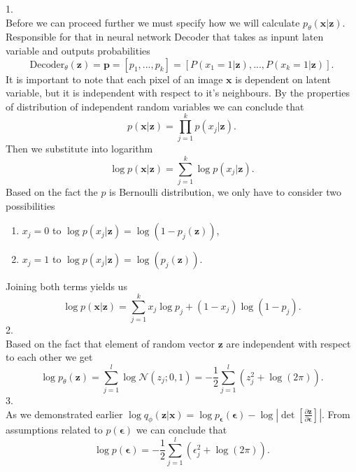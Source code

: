 \documentclass[10pt]{article}
\begin{document}
1. \\
Before we can proceed further we must specify how we will calculate $p_{\theta }(\textbf{x}|\textbf{z})$. Responsible for that in neural network Decoder that takes as inpunt laten variable and outputs probabilities
\begin{displaymath}
\text{Decoder}_{\theta}(\textbf{z}) = \textbf{p} = [p_1, ..., p_k] =[P(x_{1} = 1 | \textbf{z}), ..., P(x_{k} = 1 | \textbf{z})].
\end{displaymath}
It is important to note that each pixel of an image $\textbf{x}$ is dependent on latent variable, but it is independent with respect to it's neighbours. By the properties of distribution of independent random variables we can conclude that
\begin{equation}
    p(\textbf{x}|\textbf{z}) = \prod_{j=1}^{k}p(x_j|\textbf{z}).
\end{equation}
Then we substitute into logarithm
\begin{equation}
    \log p(\textbf{x}|\textbf{z}) = \sum_{j=1}^{k} \log p(x_j|\textbf{z}).
\end{equation}
Based on the fact the $p$ is Bernoulli distribution, we only have to consider two possibilities
\begin{enumerate}
    \item $x_j = 0$ to $\log p(x_j|\textbf{z}) = \log(1 - p_j(\textbf{z}))$,
    \item $x_j = 1$ to $\log p(x_j|\textbf{z}) = \log(p_j(\textbf{z}))$.
\end{enumerate}
Joining both terms yields us 
\begin{equation}
    \log p(\textbf{x}|\textbf{z}) = \sum_{j=1}^{k} x_j \log p_j + (1-x_j)\log(1 - p_j).
\end{equation}
2. \\ 
Based on the fact that element of random vector $\textbf{z}$ are independent with respect to each other we get
\begin{equation}
     \log p_{\theta }(\textbf{z}) = \sum_{j=1}^{l}\log \mathcal{N}(z_j; 0, 1 ) 
     = -\frac{1}{2}\sum_{j=1}^{l}( z_j^{2} + \log(2\pi) ).
\end{equation}
3. \\ 
As we demonstrated earlier 
$ \log q_{\phi }(\textbf{z}|\textbf{x}) =   \log p_{\bm{\epsilon}}(\bm{\epsilon}) - 
\log \left| \det \left[\frac{\partial \textbf{z} }{\partial \bm{\epsilon}} \right] \right|  $. From assumptions related to $p( \bm{\epsilon} )$ we can conclude that
\begin{equation} \label{eq:left_prior}
    \log p(\bm{\epsilon}) = -\frac{1}{2}\sum_{j=1}^{l}( \epsilon_j^{2} + \log(2\pi) ).
\end{equation}
\end{document}
